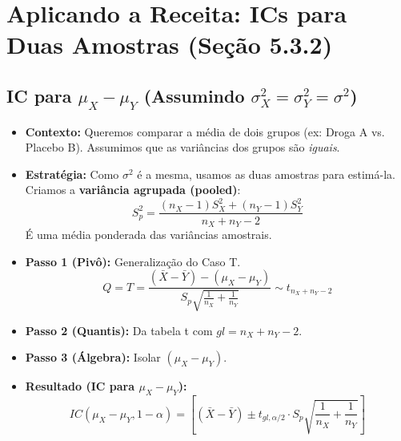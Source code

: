 \documentclass[12pt, a4paper]{article}
\theoremstyle{definition} %
\theoremstyle{remark} %
\begin{document}
\section{Aplicando a Receita: ICs para Duas Amostras (Seção 5.3.2)}

\subsection{\texorpdfstring{IC para $\mu_X - \mu_Y$ (Assumindo $\sigma_X^2 = \sigma_Y^2 = \sigma^2$)}{IC para mu_X - mu_Y (Assumindo sigma_X^2 = sigma_Y^2 = sigma^2)}}
\begin{itemize}
    \item \textbf{Contexto:} Queremos comparar a média de dois grupos (ex: Droga A vs. Placebo B). Assumimos que as variâncias dos grupos são \textit{iguais}.
    \item \textbf{Estratégia:} Como $\sigma^2$ é a mesma, usamos as duas amostras para estimá-la. Criamos a \textbf{variância agrupada (pooled)}:
        $$ S_p^2 = \frac{(n_X-1)S_X^2 + (n_Y-1)S_Y^2}{n_X + n_Y - 2} $$
    É uma média ponderada das variâncias amostrais.
    \item \textbf{Passo 1 (Pivô):} Generalização do Caso T.
        $$ Q = T = \frac{(\bar{X} - \bar{Y}) - (\mu_X - \mu_Y)}{S_p \sqrt{\frac{1}{n_X} + \frac{1}{n_Y}}} \sim t_{n_X+n_Y-2} $$
    \item \textbf{Passo 2 (Quantis):} Da tabela t com $gl = n_X + n_Y - 2$.
    \item \textbf{Passo 3 (Álgebra):} Isolar $(\mu_X - \mu_Y)$.
    \item \textbf{Resultado (IC para $\mu_X - \mu_Y$):}
        $$ IC(\mu_X - \mu_Y, 1-\alpha) = \left[ (\bar{X} - \bar{Y}) \pm t_{gl, \alpha/2} \cdot S_p \sqrt{\frac{1}{n_X} + \frac{1}{n_Y}} \right] $$
\end{itemize}
\end{document}
